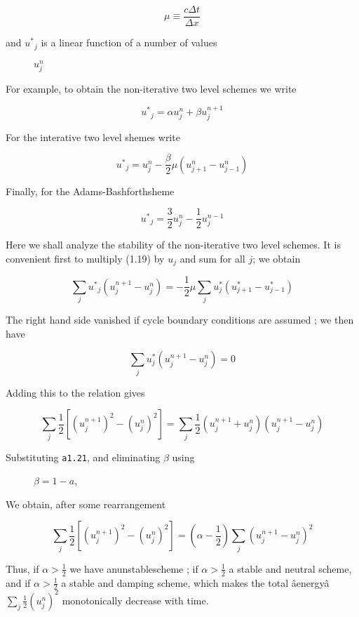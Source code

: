 {\[\mu \equiv \frac{c\Delta t}{\Delta x}\]}

\begin{description}
\item[and \({u^{*}}_{j}\) is a linear function of a number of values]
\(u_{j}^{n}\)
\end{description}

For example, to obtain the non-iterative two level schemes we write

{\[{u^{*}}_{j} = \alpha u_{j}^{n} + \beta u_{j}^{n + 1}\]}

For the interative two level shemes write

{\[{u^{*}}_{j} = u_{j}^{n} - \frac{\beta}{2}\mu\left( u_{j + 1}^{n} - u_{j - 1}^{n} \right)\]}

Finally, for the Adams-Bashforthsheme

{\[{u^{*}}_{j} = \frac{3}{2}u_{j}^{n} - \frac{1}{2}u_{j}^{n - 1}\]}

Here we shall analyze the stability of the non-iterative two level
schemes. It is convenient first to multiply (1.19) by \(u_{j}\) and sum
for all \(j\); we obtain

\[\sum_{j}{u^{*}}_{j}\left( u_{j}^{n + 1} - u_{j}^{n} \right) = - \frac{1}{2}\mu\sum_{j}u^{*}_{j}\left( u^{*}_{j+1} - u^{*}_{j - 1} \right)\]

The right hand side vanished if cycle boundary conditions are assumed ;
we then have

\[\sum_{j}u^{*}_{j}\left( u_{j}^{n + 1} - u_{j}^{n} \right) = 0\]

Adding this to the relation gives

\[\sum_{j}\frac{1}{2}\left\lbrack \left( u_{j}^{n + 1} \right)^{2} - \left( u_{j}^{n} \right)^{2} \right\rbrack = \sum_{j}\frac{1}{2}\left( u_{j}^{n + 1} + u_{j}^{n} \right)\left( u_{j}^{n + 1} - u_{j}^{n} \right)\]

\begin{description}
\item[Substituting \texttt{a1.21}, and eliminating \(\beta\) using]
\(\beta = 1 - a\),
\end{description}

We obtain, after some rearrangement

{\[\sum_{j}\frac{1}{2}\left\lbrack 
\left( u_{j}^{n + 1} \right)^{2} - \left( u_{j}^{n} \right)^{2} \right\rbrack 
= \left( \alpha - \frac{1}{2} \right)\sum_{j}\left( u_{j}^{n + 1} - u_{j}^{n} \right)^{2}\]}

Thus, if \(\alpha > \frac{1}{2}\) we have anunstablescheme ; if
\(\alpha > \frac{1}{2}\) a stable and neutral scheme, and if
\(\alpha > \frac{1}{2}\) a stable and damping scheme, which makes the
total âenergyâ \(\sum_{j}\frac{1}{2}\left( u_{j}^{n} \right)^{2}\)
monotonically decrease with time.

